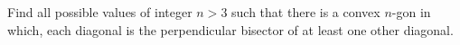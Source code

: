 Find all possible values of integer $n > 3$ such that there is a convex $n$-gon in which, each diagonal is the perpendicular bisector of at least one other diagonal.